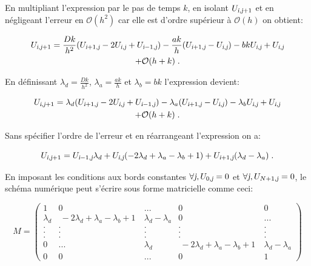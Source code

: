 \documentclass[a4paper, 12pt]{report}
\begin{document}
En multipliant l'expression par le pas de temps $k$, en isolant $U_{\textsl{i},\textsl{j}+1}$ et
en négligeant l'erreur en $\mathcal{O}(h^2)$ car elle est d'ordre supérieur à $\mathcal{O}(h)$
on obtient:

\begin{multline}
  U_{\textsl{i},\textsl{j}+1} = \frac{Dk}{h^2} (U_{\textsl{i}+1,\textsl{j}} - 2 U_{\textsl{i},\textsl{j}} + U_{\textsl{i}-1,\textsl{j}}) - \frac{ak}{h} (U_{\textsl{i}+1,\textsl{j}} - U_{\textsl{i},\textsl{j}}) - bk U_{\textsl{i},\textsl{j}} + U_{\textsl{i},\textsl{j}}\\
  + \mathcal{O}(h+k) \;.
\end{multline}

En définissant $\lambda_d = \frac{Dk}{h^2}$, $\lambda_a = \frac{ak}{h}$ et
$\lambda_b = bk$ l'expression devient:

\begin{multline}
  U_{\textsl{i},\textsl{j}+1} = \lambda_d (U_{\textsl{i}+1,\textsl{j}} - 2 U_{\textsl{i},\textsl{j}} + U_{\textsl{i}-1,\textsl{j}}) - \lambda_a (U_{\textsl{i}+1,\textsl{j}} - U_{\textsl{i},\textsl{j}}) - \lambda_b U_{\textsl{i},\textsl{j}} + U_{\textsl{i},\textsl{j}}\\
  + \mathcal{O}(h+k) \;.
\end{multline}

Sans spécifier l'ordre de l'erreur et en réarrangeant l'expression on a:

\begin{equation}
  U_{\textsl{i},\textsl{j}+1} = U_{\textsl{i}-1,\textsl{j}} \lambda_d + U_{\textsl{i},\textsl{j}} (-2 \lambda_d + \lambda_a - \lambda_b +1) + U_{\textsl{i}+1, \textsl{j}} (\lambda_d - \lambda_a)\;.
  \label{eq:schema_num_sans_erreur}
\end{equation}

En imposant les conditions aux bords constantes $\forall \textsl{j}, U_{0,\textsl{j}} = 0$
et $\forall \textsl{j}, U_{N+1,\textsl{j}} = 0$, le schéma numérique peut s'écrire
sous forme matricielle comme ceci:

\begin{equation}
  M =
  \begin{pmatrix}
     1 & 0 & ... & 0 & 0 \\
     \lambda_d & \ -2 \lambda_d + \lambda_a - \lambda_b + 1 \ & \lambda_d-\lambda_a &  0 & ...\\
     . & . & . &  . & .\\
     . & . & . &  . & .\\
     . & . & . &  . & .\\
     0 & ... & \lambda_d & \ -2 \lambda_d + \lambda_a - \lambda_b + 1 \ & \lambda_d-\lambda_a\\
     0 & 0 & ... & 0 & 1
  \end{pmatrix}
\end{equation}
\end{document}
